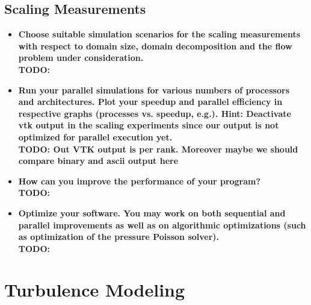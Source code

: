\documentclass[a4paper]{article}
\newcommand{\td}[1]{
	\textbf{\color{red}TODO: {#1}}
}
\begin{document}
\subsection{Scaling Measurements}
\begin{itemize}
	\item \textbf{Choose suitable simulation scenarios for the scaling measurements with respect to domain size, domain decomposition and the flow problem under consideration.}\\
	\td{}
	\item \textbf{Run your parallel simulations for various numbers of processors and architectures. Plot your speedup and parallel efficiency in respective graphs (processes vs. speedup, e.g.). Hint: Deactivate vtk output in the scaling experiments since our output is not optimized for parallel execution yet.}\\
	\td{Out VTK output is per rank. Moreover maybe we should compare binary and ascii output here}
	\item\textbf{How can you improve the performance of your program?}\\
	\td{}
	\item\textbf{Optimize your software. You may work on both sequential and parallel improvements as well as on algorithmic optimizations (such as optimization of the pressure Poisson solver).}\\
	\td{}
\end{itemize}

\section{Turbulence Modeling}
\end{document}
